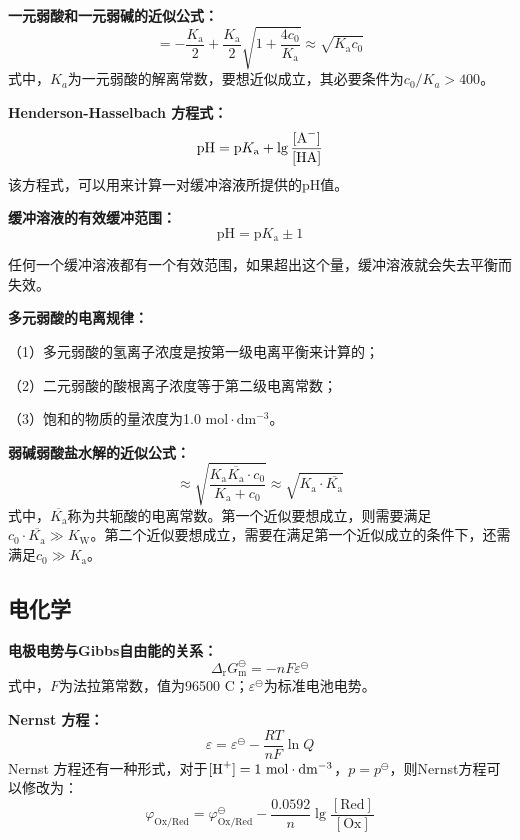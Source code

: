 \documentclass[
  10pt,
  twoside,
  openany,
  b5paper, %
  colorscheme = basic, %
  xits = false,
]{qyxf-book}
\begin{document}
\textbf{一元弱酸和一元弱碱的近似公式：}
	\begin{equation*}
		[\ce{H+}] = -\frac{K_\mathrm{a}}{2}+\frac{K_\mathrm{a}}{2}\sqrt{1+\frac{4c_0}{K_\mathrm{a}}} \approx \sqrt{K_\mathrm{a}c_0}
	\end{equation*}
式中，$K_a$为一元弱酸的解离常数，要想近似成立，其必要条件为$c_0/K_a > 400$。

\textbf{Henderson-Hasselbach 方程式：}
	\begin{equation*}
		\mathrm{pH}  = \mathrm{p}K_\mathrm{a} + \lg \frac{[\ce{A-}]}{[\ce{HA}]}
	\end{equation*}
该方程式，可以用来计算一对缓冲溶液所提供的pH值。

\textbf{缓冲溶液的有效缓冲范围：}
	\begin{equation*}
		\mathrm{pH} = \mathrm{p}K_\mathrm{a} \pm 1
	\end{equation*}

任何一个缓冲溶液都有一个有效范围，如果超出这个量，缓冲溶液就会失去平衡而失效。

\textbf{多元弱酸的电离规律：}

（1）多元弱酸的氢离子浓度是按第一级电离平衡来计算的；

（2）二元弱酸的酸根离子浓度等于第二级电离常数；
 
（3）饱和的物质的量浓度为1.0 $\mathrm{mol \cdot dm^\mathrm{-3}}$。

\textbf{弱碱弱酸盐水解的近似公式：}
	\begin{equation*}
		[\ce{H+}] \approx \sqrt{\frac{K_\mathrm{a}\overline{K_\mathrm{a}}\cdot c_0}{K_\mathrm{a}+c_0}} \approx \sqrt{K_\mathrm{a} \cdot \overline{K_\mathrm{a}}}
	\end{equation*}
式中，$\overline{K_\mathrm{a}}$称为共轭酸的电离常数。第一个近似要想成立，则需要满足$c_0 \cdot \overline{K_\mathrm{a}} \gg K_\mathrm{W}$。第二个近似要想成立，需要在满足第一个近似成立的条件下，还需满足$c_0 \gg K_\mathrm{a}$。

\subsection{电化学}

\textbf{电极电势与Gibbs自由能的关系：}
	\begin{equation*}
		\Delta_\mathrm{r}G^\ominus_\mathrm{m} = -nF\varepsilon^\ominus
	\end{equation*}
式中，$F$为法拉第常数，值为96500 C；$\varepsilon^\ominus$为标准电池电势。

\textbf{Nernst 方程：}
	\begin{equation*}
		\varepsilon = \varepsilon^\ominus - \frac{RT}{nF} \ln Q
	\end{equation*}
Nernst 方程还有一种形式，对于$[\ce{H+}] = 1 \ \mathrm{mol \cdot dm^\mathrm{-3}}$，$p = p^\ominus$，则Nernst方程可以修改为：
	\begin{equation*}
		\varphi_\mathrm{Ox/Red}=\varphi^\ominus_\mathrm{Ox/Red} - \frac{0.0592}{n} \lg \frac{[\mathrm{Red}]}{[\mathrm{Ox}]}
	\end{equation*}
\end{document}
